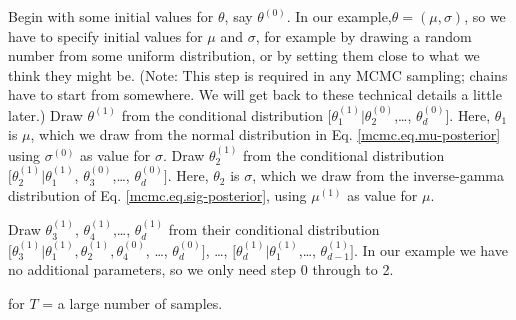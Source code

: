 { Begin with some initial values for $\theta$, say $\theta^{(0)}$.}
In our example,$\theta =(\mu,\sigma)$, so we have to specify initial values for $\mu$ and $\sigma$, for
example by drawing a random number from some uniform distribution, or
by setting them close to what we think they might be. (Note: This step
is required in any MCMC sampling; chains have to start from
somewhere. We will get back to these technical details a little
later.)
{ Draw $\theta^{(1)}$ from the conditional distribution $[\theta_{1}^{(1)}|\theta_{2}^{(0)}$,\ldots, $\theta_{d}^{(0)}]$. }
Here, $\theta_1$ is $\mu$, which we draw from the normal distribution in Eq. \ref{mcmc.eq.mu-posterior}  using $\sigma^{(0)}$ as value for $\sigma$.
{ Draw $\theta_{2}^{(1)}$ from the conditional distribution $[\theta_{2}^{(1)}|\theta_{1}^{(1)}$, $\theta_{3}^{(0)}$,\ldots, $\theta_{d}^{(0)}]$. }
Here, $\theta_2$ is $\sigma$, which we draw from the inverse-gamma
distribution of Eq. \ref{mcmc.eq.sig-posterior}, using $\mu^{(1)}$ as value for $\mu$.

{ Draw $\theta_{3}^{(1)}$, $\theta_{4}^{(1)}$,\ldots, $\theta_{d}^{(1)}$ from their conditional distribution $[\theta_{3}^{(1)}|\theta_{1}^{(1)}, \theta_{2}^{(1)}, \theta_{4}^{(0)}$, \ldots, $\theta_{d}^{(0)}]$, \ldots, $[\theta_{d}^{(1)}|\theta_{1}^{(1)}$,\ldots, $\theta_{d-1}^{(1)}]$. }
In our example we have no additional parameters, so we only need step 0 through to 2.

{ for $T$ = a large number of samples.}

